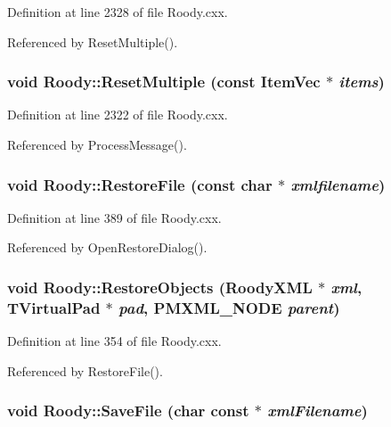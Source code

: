 Definition at line 2328 of file Roody.cxx.

Referenced by ResetMultiple().
\subsubsection[{ResetMultiple}]{\setlength{\rightskip}{0pt plus 5cm}void Roody::ResetMultiple (const {\bf ItemVec} $\ast$ {\em items})\hspace{0.3cm}{\ttfamily  [private]}}\label{classRoody_a7d179c67bbdfd0d6766765e2a246fa19}


Definition at line 2322 of file Roody.cxx.

Referenced by ProcessMessage().
\subsubsection[{RestoreFile}]{\setlength{\rightskip}{0pt plus 5cm}void Roody::RestoreFile (const char $\ast$ {\em xmlfilename})}\label{classRoody_a6a1265f21760af02be06eaa222c74d0a}


Definition at line 389 of file Roody.cxx.

Referenced by OpenRestoreDialog().
\subsubsection[{RestoreObjects}]{\setlength{\rightskip}{0pt plus 5cm}void Roody::RestoreObjects ({\bf RoodyXML} $\ast$ {\em xml}, \/  TVirtualPad $\ast$ {\em pad}, \/  {\bf PMXML\_\-NODE} {\em parent})\hspace{0.3cm}{\ttfamily  [private]}}\label{classRoody_ae503ce0b33c7a802c25ffc1cd6acc4c3}


Definition at line 354 of file Roody.cxx.

Referenced by RestoreFile().
\subsubsection[{SaveFile}]{\setlength{\rightskip}{0pt plus 5cm}void Roody::SaveFile (char const $\ast$ {\em xmlFilename})\hspace{0.3cm}{\ttfamily  [private]}}\label{classRoody_aead15bc9d8344b174cfdb718c32b26b9}


